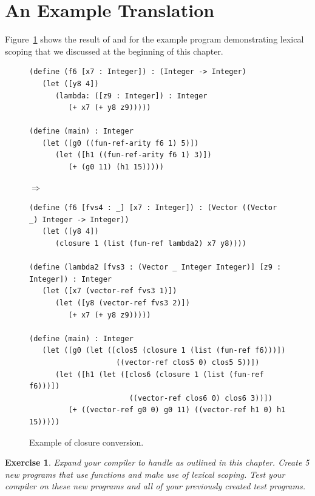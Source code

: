 \documentclass[11pt]{book}
\newtheorem{exercise}[theorem]{Exercise}
\begin{document}
\section{An Example Translation}
\label{sec:example-lambda}

Figure~\ref{fig:lexical-functions-example} shows the result of
 and  for the example
program demonstrating lexical scoping that we discussed at the
beginning of this chapter.


\begin{figure}[tbp]
  \begin{minipage}{0.8\textwidth}
\begin{lstlisting}[basicstyle=\ttfamily\footnotesize]
(define (f6 [x7 : Integer]) : (Integer -> Integer)
   (let ([y8 4])
      (lambda: ([z9 : Integer]) : Integer
         (+ x7 (+ y8 z9)))))

(define (main) : Integer
   (let ([g0 ((fun-ref-arity f6 1) 5)])
      (let ([h1 ((fun-ref-arity f6 1) 3)])
         (+ (g0 11) (h1 15)))))
\end{lstlisting}
$\Rightarrow$
\begin{lstlisting}[basicstyle=\ttfamily\footnotesize]
(define (f6 [fvs4 : _] [x7 : Integer]) : (Vector ((Vector _) Integer -> Integer))
   (let ([y8 4])
      (closure 1 (list (fun-ref lambda2) x7 y8))))

(define (lambda2 [fvs3 : (Vector _ Integer Integer)] [z9 : Integer]) : Integer
   (let ([x7 (vector-ref fvs3 1)])
      (let ([y8 (vector-ref fvs3 2)])
         (+ x7 (+ y8 z9)))))

(define (main) : Integer
   (let ([g0 (let ([clos5 (closure 1 (list (fun-ref f6)))])
                    ((vector-ref clos5 0) clos5 5))])
      (let ([h1 (let ([clos6 (closure 1 (list (fun-ref f6)))])
                       ((vector-ref clos6 0) clos6 3))])
         (+ ((vector-ref g0 0) g0 11) ((vector-ref h1 0) h1 15)))))
\end{lstlisting}
\end{minipage}

\caption{Example of closure conversion.}
\label{fig:lexical-functions-example}
\end{figure}

\begin{exercise}\normalfont
Expand your compiler to handle \LangLam{} as outlined in this chapter.
Create 5 new programs that use  functions and make use of
lexical scoping. Test your compiler on these new programs and all of
your previously created test programs.
\end{exercise}
\end{document}
